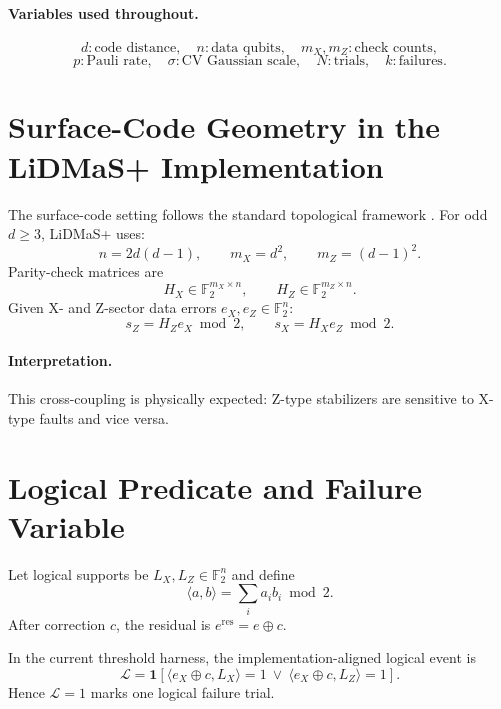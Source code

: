 \documentclass[11pt]{article}
\newcommand{\F}{\mathbb{F}_2}
\newcommand{\ind}[1]{\mathbf{1}\!\left[#1\right]}
\begin{document}
\paragraph{Variables used throughout.}
\begin{equation}
d:\text{code distance},\quad n:\text{data qubits},\quad m_X,m_Z:\text{check counts},
\end{equation}
\begin{equation}
p:\text{Pauli rate},\quad \sigma:\text{CV Gaussian scale},\quad N:\text{trials},\quad k:\text{failures}.
\end{equation}

\section{Surface-Code Geometry in the LiDMaS+ Implementation}
The surface-code setting follows the standard topological framework \cite{surfacecode1998}. For odd $d\ge 3$, LiDMaS+ uses:
\begin{equation}
n=2d(d-1),\qquad m_X=d^2,\qquad m_Z=(d-1)^2.
\end{equation}
Parity-check matrices are
\begin{equation}
H_X\in\F^{m_X\times n},\qquad H_Z\in\F^{m_Z\times n}.
\end{equation}
Given X- and Z-sector data errors $e_X,e_Z\in\F^n$:
\begin{equation}
s_Z = H_Z e_X \bmod 2,\qquad s_X = H_X e_Z \bmod 2.
\end{equation}

\paragraph{Interpretation.}
This cross-coupling is physically expected: Z-type stabilizers are sensitive to X-type faults and vice versa.

\section{Logical Predicate and Failure Variable}
Let logical supports be $L_X,L_Z\in\F^n$ and define
\begin{equation}
\langle a,b\rangle=\sum_i a_ib_i\bmod 2.
\end{equation}
After correction $c$, the residual is $e^{\mathrm{res}}=e\oplus c$.

In the current threshold harness, the implementation-aligned logical event is
\begin{equation}
\mathcal{L}=
\ind{
\langle e_X\oplus c,L_X\rangle=1
\ \lor\
\langle e_X\oplus c,L_Z\rangle=1
}.
\end{equation}
Hence $\mathcal{L}=1$ marks one logical failure trial.
\end{document}
